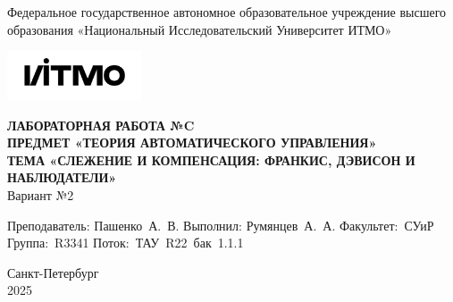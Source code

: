 \documentclass[a4paper, 12pt]{article}
\begin{document}
    \begin{titlepage}

        \begin{center}
        Федеральное государственное автономное образовательное учреждение высшего образования
        «Национальный Исследовательский Университет ИТМО»
        \vfill
        
        \includegraphics[width=0.3\textwidth]{itmo.png} %

        {\large\bf ЛАБОРАТОРНАЯ РАБОТА №C}\\
        {\large\bf ПРЕДМЕТ «ТЕОРИЯ АВТОМАТИЧЕСКОГО УПРАВЛЕНИЯ»}\\
        {\large\bf ТЕМА «СЛЕЖЕНИЕ И КОМПЕНСАЦИЯ: ФРАНКИС, ДЭВИСОН И НАБЛЮДАТЕЛИ»}\\
        Вариант №2
        \vfill

        \begin{flushright}
            \begin{minipage}{.45\textwidth}
            {
                \hbox{Преподаватель:}
                \hbox{Пашенко А. В.}
                \hbox{}
                \hbox{Выполнил:}
                \hbox{Румянцев А. А.}
                \hbox{}
                \hbox{Факультет: СУиР}
                \hbox{Группа: R3341}
                \hbox{Поток: ТАУ R22 бак 1.1.1}
            }
            \end{minipage}
        \end{flushright}
        \vfill
  
        Санкт-Петербург\\
        2025
        \end{center}
    \end{titlepage}
    
    \tableofcontents

    \newpage
\end{document}
